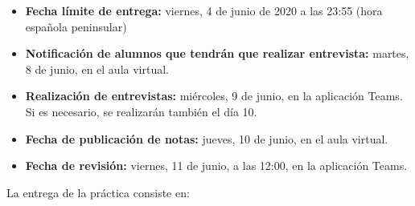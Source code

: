 \begin{itemize}
  \item \textbf{Fecha límite de entrega:} viernes, 4 de junio de 2020 a las 23:55 (hora española peninsular)

  \item \textbf{Notificación de alumnos que tendrán que realizar entrevista:} martes, 8 de junio, en el aula virtual.

  \item \textbf{Realización de entrevistas:} miércoles, 9 de junio, en la aplicación Teams. Si es necesario, se realizarán también el día 10.
    
  \item \textbf{Fecha de publicación de notas:} jueves, 10 de junio, en el aula virtual.

  \item \textbf{Fecha de revisión:} viernes, 11 de junio, a las 12:00, en la aplicación Teams.
\end{itemize}

La entrega de la práctica consiste en:

